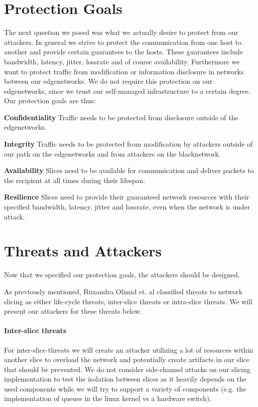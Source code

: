 \section{Protection Goals}
\label{protection_goals}
The next question we posed was what we actually desire to protect from our attackers. In general we strive to protect the communication from one host to another and provide certain guarantees to the hosts. These guarantees include \gls{bandwidth}, \gls{latency}, \gls{jitter}, \gls{lossrate} and of course availability. Furthermore we want to protect traffic from modification or information disclosure in networks between our \gls{edgenetwork}s. We do not require this protection on our \gls{edgenetwork}s, since we trust our self-managed infrastructure to a certain degree. Our protection goals are thus:
\begin{description}[style=multiline, labelwidth=0.7cm]
    \item[\namedlabel{P1}{P1}] \textbf{Confidentiality} Traffic needs to be protected from disclosure outside of the \gls{edgenetwork}s.
    \item[\namedlabel{P2}{P2}] \textbf{Integrity} Traffic needs to be protected from modification by attackers outside of our path on the \gls{edgenetwork}s and from attackers on the \gls{blacknetwork}.
    \item[\namedlabel{P3}{P3}] \textbf{Availability} Slices need to be available for communication and deliver packets to the recipient at all times during their lifespan.
    \item[\namedlabel{P4}{P4}] \textbf{Resilience} Slices need to provide their guaranteed network resources with their specified \gls{bandwidth}, \gls{latency}, \gls{jitter} and \gls{lossrate}, even when the network is under attack.
\end{description}


\section{Threats and Attackers}
\label{adversaries}
Now that we specified our protection goals, the attackers should be designed.

As previously mentioned, Ruxandra Olimid et. al \cite{SE2} classified threats to network slicing as either life-cycle threats, inter-slice threats or intra-slice threats. We will present our attackers for these threats below.

\paragraph{Inter-slice threats} For inter-slice threats we will create an attacker utilizing a lot of resources within another slice to overload the network and potentially create artifacts in our slice that should be prevented. We do not consider side-channel attacks on our slicing implementation to test the isolation between slices as it heavily depends on the used components while we will try to support a variety of components (e.g. the implementation of queues in the linux kernel vs a hardware switch).

